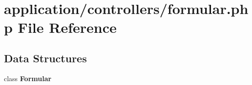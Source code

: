 \section{application/controllers/formular.php File Reference}
\label{formular_8php}
\subsection*{Data Structures}
\begin{DoxyCompactItemize}
\item 
class {\bf Formular}
\end{DoxyCompactItemize}
